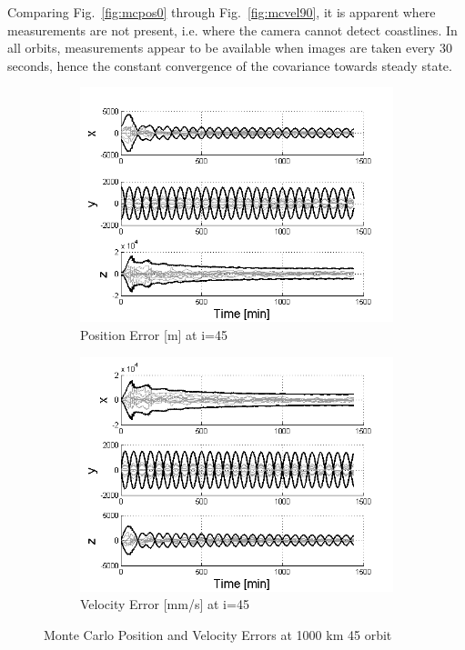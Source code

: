 \documentclass[]{aiaa-tc}%
\begin{document}
%
Comparing Fig.~\ref{fig:mcpos0} through Fig.~\ref{fig:mcvel90}, it is apparent where measurements are not present, i.e. where the camera cannot detect coastlines.  In all orbits, measurements appear to be available when images are taken every 30 seconds, hence the constant convergence of the covariance towards steady state.  
\begin{figure}[ht!]
\centering
\begin{subfigure}{.5\textwidth}
  \centering
  \includegraphics[width=0.9\linewidth]{MC_pos45}
  \caption{Position Error [m] at i=45\degree}
  \label{fig:mcpos45}
\end{subfigure}%
\begin{subfigure}{.5\textwidth} 
  \centering
  \includegraphics[width=0.9\linewidth]{MC_vel45}
  \caption{Velocity Error [mm/s] at i=45\degree}
  \label{fig:coastline}
\end{subfigure}
\caption{Monte Carlo Position and Velocity Errors at 1000 km 45 \degree orbit}
\label{fig:mcvel45}
\end{figure}
\end{document}
